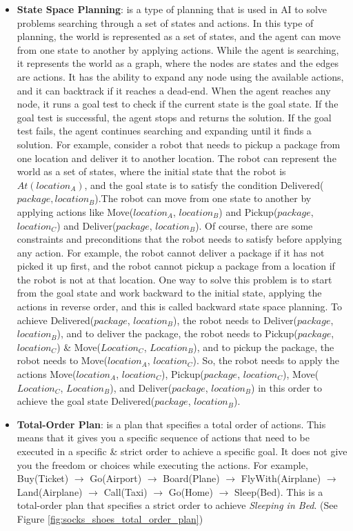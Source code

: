 \begin{itemize}
  \item \label{def:state_space_planning}
        \textbf{State Space Planning}: is a type of planning that is used in \ac{AI} to solve problems searching through a set of states and actions. In this type of planning, the world is represented as a set of states, and the agent can move from one state to another by applying actions. While the agent is searching, it represents the world as a graph, where the nodes are states and the edges are actions. It has the ability to expand any node using the available actions, and it can backtrack if it reaches a dead-end. When the agent reaches any node, it runs a goal test to check if the current state is the goal state. If the goal test is successful, the agent stops and returns the solution. If the goal test fails, the agent continues searching and expanding until it finds a solution. For example, consider a robot that needs to pickup a package from one location and deliver it to another location. The robot can represent the world as a set of states, where the initial state that the robot is $At(location_A)$, and the goal state is to satisfy the condition Delivered($package, location_B$).The robot can move from one state to another by applying actions like Move($location_A$, $location_B$) and Pickup($package$, $location_C$) and Deliver($package$, $location_B$). Of course, there are some constraints and preconditions that the robot needs to satisfy before applying any action. For example, the robot cannot deliver a package if it has not picked it up first, and the robot cannot pickup a package from a location if the robot is not at that location. One way to solve this problem is to start from the goal state and work backward to the initial state, applying the actions in reverse order, and this is called backward state space planning. To achieve Delivered($package$, $location_B$), the robot needs to Deliver($package$, $location_B$), and to deliver the package, the robot needs to Pickup($package$, $location_C$) \& Move($Location_C$, $Location_B$), and to pickup the package, the robot needs to Move($location_A$, $location_C$). So, the robot needs to apply the actions Move($location_A$, $location_C$), Pickup($package$, $location_C$), Move($Location_C$, $Location_B$), and Deliver($package$, $location_B$) in this order to achieve the goal state Delivered($package$, $location_B$).

  \item \label{def:total_order_plan}
        \textbf{Total-Order Plan}: is a plan that specifies a total order of actions. This means that it gives you a specific sequence of actions that need to be executed in a specific \& strict order to achieve a specific goal. It does not give you the freedom or choices while executing the actions. For example, Buy(Ticket) $\rightarrow$ Go(Airport) $\rightarrow$ Board(Plane) $\rightarrow$ FlyWith(Airplane) $\rightarrow$ Land(Airplane) $\rightarrow$ Call(Taxi) $\rightarrow$ Go(Home) $\rightarrow$ Sleep(Bed). This is a total-order plan that specifies a strict order to achieve \textit{Sleeping in Bed}. (See Figure \ref{fig:socks_shoes_total_order_plan})
        \begin{figure}[ht]
          \centering


\end{figure}
\end{itemize}
